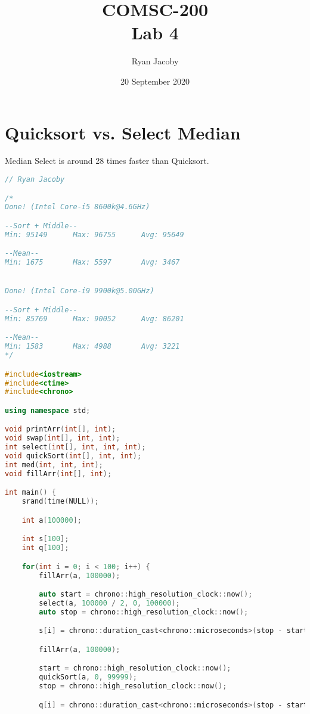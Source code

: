 \documentclass[letterpaper, 11pt]{article}
\title{COMSC-200 \\ Lab 4}
\author{Ryan Jacoby}
\date{20 September 2020}
\begin{document}
\maketitle

\section{Quicksort vs. Select Median}

Median Select is around 28 times faster than Quicksort.

\begin{lstlisting}[language=c++, caption=main.cpp]
// Ryan Jacoby

/*
Done! (Intel Core-i5 8600k@4.6GHz)

--Sort + Middle--
Min: 95149      Max: 96755      Avg: 95649

--Mean--
Min: 1675       Max: 5597       Avg: 3467


Done! (Intel Core-i9 9900k@5.00GHz)

--Sort + Middle--
Min: 85769      Max: 90052      Avg: 86201

--Mean--
Min: 1583       Max: 4988       Avg: 3221
*/

#include<iostream>
#include<ctime>
#include<chrono>

using namespace std;

void printArr(int[], int);
void swap(int[], int, int);
int select(int[], int, int, int);
void quickSort(int[], int, int);
int med(int, int, int);
void fillArr(int[], int);

int main() {
    srand(time(NULL));

    int a[100000];

    int s[100];
    int q[100];

    for(int i = 0; i < 100; i++) {
        fillArr(a, 100000);

        auto start = chrono::high_resolution_clock::now();
        select(a, 100000 / 2, 0, 100000);
        auto stop = chrono::high_resolution_clock::now();

        s[i] = chrono::duration_cast<chrono::microseconds>(stop - start).count();

        fillArr(a, 100000);

        start = chrono::high_resolution_clock::now();
        quickSort(a, 0, 99999);
        stop = chrono::high_resolution_clock::now();

        q[i] = chrono::duration_cast<chrono::microseconds>(stop - start).count();


\end{lstlisting}
\end{document}
